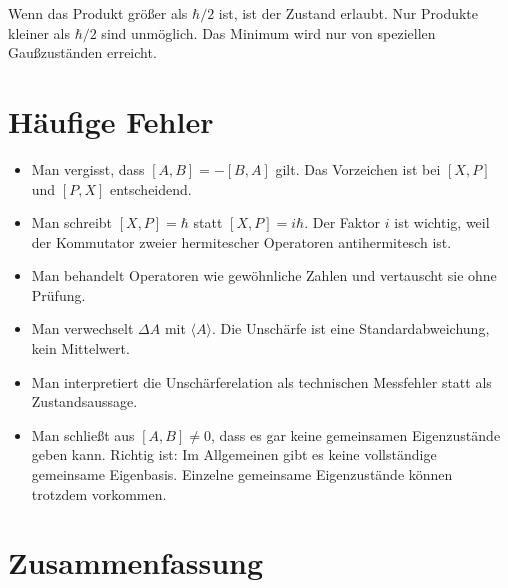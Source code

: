 \begin{notebox}
Wenn das Produkt größer als $\hbar/2$ ist, ist der Zustand erlaubt. Nur Produkte kleiner als $\hbar/2$ sind unmöglich. Das Minimum wird nur von speziellen Gaußzuständen erreicht.
\end{notebox}

\section{Häufige Fehler}

\begin{itemize}
    \item Man vergisst, dass $[A,B]=-[B,A]$ gilt. Das Vorzeichen ist bei $[X,P]$ und $[P,X]$ entscheidend.
    \item Man schreibt $[X,P]=\hbar$ statt $[X,P]=i\hbar$. Der Faktor $i$ ist wichtig, weil der Kommutator zweier hermitescher Operatoren antihermitesch ist.
    \item Man behandelt Operatoren wie gewöhnliche Zahlen und vertauscht sie ohne Prüfung.
    \item Man verwechselt $\Delta A$ mit $\langle A\rangle$. Die Unschärfe ist eine Standardabweichung, kein Mittelwert.
    \item Man interpretiert die Unschärferelation als technischen Messfehler statt als Zustandsaussage.
    \item Man schließt aus $[A,B]\ne0$, dass es gar keine gemeinsamen Eigenzustände geben kann. Richtig ist: Im Allgemeinen gibt es keine vollständige gemeinsame Eigenbasis. Einzelne gemeinsame Eigenzustände können trotzdem vorkommen.
\end{itemize}

\section{Zusammenfassung}

